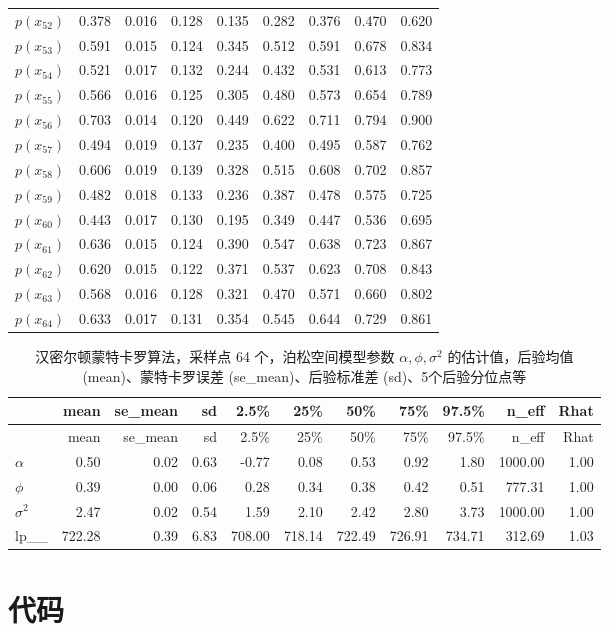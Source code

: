 \documentclass[12pt,a4paper,UTF8,twoside]{book}
\theoremstyle{definition}
\theoremstyle{definition}
\theoremstyle{definition}
\theoremstyle{remark}
\begin{document}
\begin{longtable}[]{@{}lrrrrrrrr@{}}
\(p(x_{52})\) & 0.378 & 0.016 & 0.128 & 0.135 & 0.282 & 0.376 & 0.470 & 0.620\tabularnewline
\(p(x_{53})\) & 0.591 & 0.015 & 0.124 & 0.345 & 0.512 & 0.591 & 0.678 & 0.834\tabularnewline
\(p(x_{54})\) & 0.521 & 0.017 & 0.132 & 0.244 & 0.432 & 0.531 & 0.613 & 0.773\tabularnewline
\(p(x_{55})\) & 0.566 & 0.016 & 0.125 & 0.305 & 0.480 & 0.573 & 0.654 & 0.789\tabularnewline
\(p(x_{56})\) & 0.703 & 0.014 & 0.120 & 0.449 & 0.622 & 0.711 & 0.794 & 0.900\tabularnewline
\(p(x_{57})\) & 0.494 & 0.019 & 0.137 & 0.235 & 0.400 & 0.495 & 0.587 & 0.762\tabularnewline
\(p(x_{58})\) & 0.606 & 0.019 & 0.139 & 0.328 & 0.515 & 0.608 & 0.702 & 0.857\tabularnewline
\(p(x_{59})\) & 0.482 & 0.018 & 0.133 & 0.236 & 0.387 & 0.478 & 0.575 & 0.725\tabularnewline
\(p(x_{60})\) & 0.443 & 0.017 & 0.130 & 0.195 & 0.349 & 0.447 & 0.536 & 0.695\tabularnewline
\(p(x_{61})\) & 0.636 & 0.015 & 0.124 & 0.390 & 0.547 & 0.638 & 0.723 & 0.867\tabularnewline
\(p(x_{62})\) & 0.620 & 0.015 & 0.122 & 0.371 & 0.537 & 0.623 & 0.708 & 0.843\tabularnewline
\(p(x_{63})\) & 0.568 & 0.016 & 0.128 & 0.321 & 0.470 & 0.571 & 0.660 & 0.802\tabularnewline
\(p(x_{64})\) & 0.633 & 0.017 & 0.131 & 0.354 & 0.545 & 0.644 & 0.729 & 0.861\tabularnewline
\bottomrule
\end{longtable}

\begin{longtable}[]{@{}lrrrrrrrrrr@{}}
\caption{\label{tab:HMC-Pois-SGLMM} 汉密尔顿蒙特卡罗算法，采样点 64 个，泊松空间模型参数 \(\alpha,\phi,\sigma^2\) 的估计值，后验均值(mean)、蒙特卡罗误差 (se\_mean)、后验标准差 (sd)、5个后验分位点等}\tabularnewline
\toprule
& mean & se\_mean & sd & 2.5\% & 25\% & 50\% & 75\% & 97.5\% & n\_eff & Rhat\tabularnewline
\midrule
\endfirsthead
\toprule
& mean & se\_mean & sd & 2.5\% & 25\% & 50\% & 75\% & 97.5\% & n\_eff & Rhat\tabularnewline
\midrule
\endhead
\(\alpha\) & 0.50 & 0.02 & 0.63 & -0.77 & 0.08 & 0.53 & 0.92 & 1.80 & 1000.00 & 1.00\tabularnewline
\(\phi\) & 0.39 & 0.00 & 0.06 & 0.28 & 0.34 & 0.38 & 0.42 & 0.51 & 777.31 & 1.00\tabularnewline
\(\sigma^2\) & 2.47 & 0.02 & 0.54 & 1.59 & 2.10 & 2.42 & 2.80 & 3.73 & 1000.00 & 1.00\tabularnewline
lp\_\_ & 722.28 & 0.39 & 6.83 & 708.00 & 718.14 & 722.49 & 726.91 & 734.71 & 312.69 & 1.03\tabularnewline
\bottomrule
\end{longtable}

\hypertarget{simulate-code}{%
\section*{代码}\label{simulate-code}}
\end{document}
